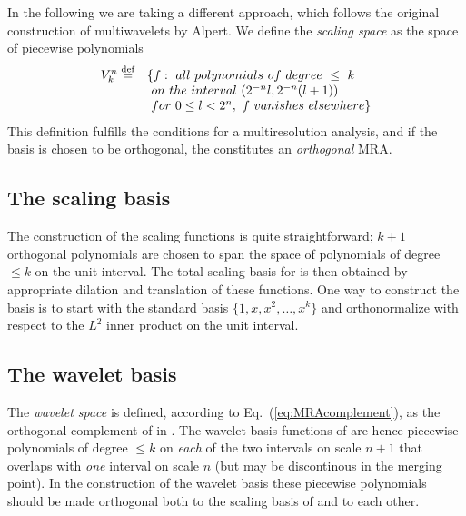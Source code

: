 In the following we are taking a different approach, which follows the original 
construction of multiwavelets by Alpert\cite{Alpert:1993p5460}. We define the 
\emph{scaling space}  as the space of piecewise polynomials
\begin{equation}
    \label{eq:scaling_space_def}
    \begin{array}{rl}
        \displaystyle {V}_{k}^{n} \stackrel{\text{def}}{\hbox{=}} & 
	    \lbrace f:\ all\ polynomials\ of\ degree\ \leq\ k\\ 
	\displaystyle &\ on\ the\ interval\ (2^{-n}l,2^{-n}(l+1))\\
	\displaystyle &\ for\ 0 \leq l < 2^n,\ f\ vanishes\ elsewhere \rbrace
    \end{array}
\end{equation}
This definition fulfills the conditions for a multiresolution analysis, and if the 
basis is chosen to be orthogonal, the  constitutes an \emph{orthogonal} MRA.

\subsection{The scaling basis}
The construction of the scaling functions is quite straightforward; $k+1$ orthogonal 
polynomials are chosen to span the space of polynomials of degree $\leq k$ on the unit 
interval. The total scaling basis for  is then obtained by appropriate dilation 
and translation of these functions. One way to construct the basis is to start with the 
standard basis $\lbrace 1,x,x^2,\dots,x^k\rbrace$ and orthonormalize with respect to 
the $L^2$ inner product on the unit interval.

\subsection{The wavelet basis}
The \emph{wavelet space}  is defined, according to 
Eq.~(\ref{eq:MRAcomplement}), as the orthogonal complement of  
in . The wavelet basis functions of  are hence 
piecewise polynomials of degree $\leq k$ on \emph{each} of the two intervals on 
scale $n+1$ that overlaps with \emph{one} interval on scale $n$ (but may be 
discontinous in the merging point). In the construction of the wavelet basis 
these piecewise polynomials should be made orthogonal both to the scaling basis 
of  and to each other.

